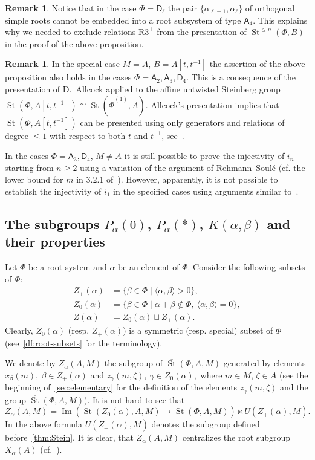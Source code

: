 \documentclass[oneside, 8pt]{amsart}
\theoremstyle{remark}
\theoremstyle{definition}
\numberwithin{lemma}{section}
\numberwithin{prop}{section}
\numberwithin{corollary}{section}
\numberwithin{externaltheorem}{section}
\newtheorem{rem}[lemma]{Remark}
\DeclareMathOperator{\Img}{Im}
\DeclareMathOperator{\St}{St}
\newcommand{\inv}{^{-1}}
\newcommand{\rA}{\mathsf{A}}
\newcommand{\rD}{\mathsf{D}}
\numberwithin{equation}{section}
\begin{document}
\begin{rem}
 Notice that in the case $\Phi=\rD_\ell$ the pair $\{\alpha_{\ell-1}, \alpha_{\ell}\}$ of orthogonal simple roots cannot be embedded into a root subsystem of type $\rA_4$. This explains why we needed to exclude relations $\text{R3}^\bot$ from the presentation of $\St^{\leq n}(\Phi, B)$ in the proof of the above proposition.
\end{rem}
\begin{rem}
 In the special case $M=A$, $B = A[t, t\inv]$ the assertion of the above proposition also holds in the cases $\Phi=\rA_2, \rA_3, \rD_4$. This is a consequence of the presentation of D.~Allcock applied to the affine untwisted Steinberg group $\St(\Phi, A[t, t\inv]) \cong \St(\widetilde{\Phi}^{(1)}, A)$. Allcock's presentation implies that $\St(\Phi, A[t, t\inv])$ can be presented using only generators and relations of degree $\leq 1$ with respect to both $t$ and $t^{-1}$, see~\cite[Corollary~1.3]{A13}.
 
 In the cases $\Phi = \rA_3, \rD_4$, $M \neq A$ it is still possible to prove the injectivity of $i_n$ starting from $n\geq 2$ using a variation of the argument of Rehmann--Soul{\'e} (cf. the lower bound for $m$ in 3.2.1 of~\cite{RS76}). However, apparently, it is not possible to establish the injectivity of $i_1$ in the specified cases using arguments similar to~\cite{RS76}.
\end{rem}

\subsection{The subgroups \texorpdfstring{$P_\alpha(0)$}{Pa(0)}, \texorpdfstring{$P_\alpha(*)$}{Pa(*)}, \texorpdfstring{$K(\alpha, \beta)$}{K(a,b)} and their properties} \label{sec:Pa0-basic}
Let $\Phi$ be a root system and $\alpha$ be an element of $\Phi$.
Consider the following subsets of $\Phi$:
\begin{align} Z_+(\alpha) & = \{ \beta \in \Phi \mid \langle \alpha, \beta \rangle > 0 \}, \\
   Z_0(\alpha) & = \{ \beta \in \Phi \mid \alpha + \beta \not\in \Phi,\ \langle \alpha, \beta \rangle = 0 \}, \\
   Z(\alpha)   & = Z_0(\alpha) \sqcup Z_+(\alpha). \end{align}
Clearly, $Z_0(\alpha)$ (resp. $Z_+(\alpha)$) is a symmetric (resp. special) subset of $\Phi$ (see~\cref{df:root-subsets} for the terminology).
   
We denote by $Z_\alpha(A, M)$ the subgroup of $\overline{\St}(\Phi, A, M)$ generated by elements
 $x_{\beta}(m),\ \beta \in Z_+(\alpha)$ and $z_{\gamma}(m, \zeta),\ \gamma \in Z_0(\alpha),$ where $m \in M$, $\zeta \in A$ (see the beginning of~\cref{sec:elementary} for the definition of the elements $z_\gamma(m, \zeta)$ and the group $\overline{\St}(\Phi, A, M)$).
It is not hard to see that \[Z_\alpha(A, M) = \Img\left(\overline{\St}(Z_0(\alpha), A, M) \to \overline{\St}(\Phi, A, M)\right) \ltimes U(Z_+(\alpha), M). \]
In the above formula $U(Z_+(\alpha), M)$ denotes the subgroup defined before~\cref{thm:Stein}.
It is clear, that $Z_\alpha(A, M)$ centralizes the root subgroup $X_\alpha(A)$ (cf.~\cite[984]{St71}).
\end{document}
